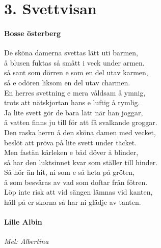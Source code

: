 \documentclass[11pt]{book}
\begin{document}


\newpage
\section*{3. Svettvisan}
\paragraph*{Bosse österberg}
$$$$
De sköna damerna svettas lätt uti barmen,\\
å blusen fuktas så smått i veck under armen.\\
så sant som dörren e som en del utav karmen,\\
så e odören liksom en del utav charmen.\\

\noindent
En herres svettning e mera våldsam å ymnig,\\
trots att nätskjortan hans e luftig å rymlig.\\
Ja lite svett gör de bara lätt när han joggar,\\
å vatten finns ju till för att få svalkande groggar.\\

\noindent
Den raska herrn å den sköna damen med vecket,\\
beslöt att pröva på lite svett under täcket.\\
Men fastän kärleken e båd döver å blinder,\\
så har den luktsinnet kvar som ställer till hinder.\\

\noindent
Så hör än hit, ni som e så heta på gröten,\\
å som besväras av vad som doftar från fötren.\\
Löp inte risk att vid sängen lämnas vid kanten,\\
håll på er skorna så har ni glädje av tanten.\\




\newpage
\noindent
\begin{minipage}{0.5\textwidth}
	\paragraph*{Lille Albin\\}
	\vspace{3px}
	\textit{Mel: Albertina}\\
\end{minipage}
\end{document}
